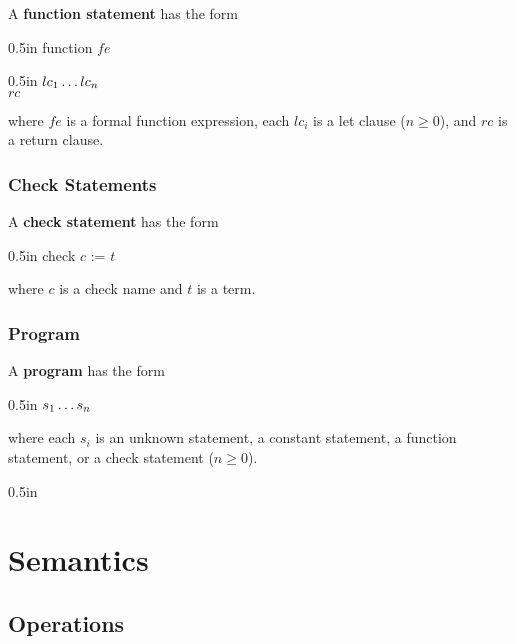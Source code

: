 \documentclass[letterpaper, 12pt]{extarticle}
\theoremstyle{definition} %
\newcommand{\textdef}[1]{\textbf{#1}}
\newenvironment{codeblock}
    {\begin{addmargin}{0.5in} \ttfamily}
    {\end{addmargin}}
\begin{document}
A \textdef{function statement} has the form
\begin{codeblock}
function $fe$
    \begin{codeblock}
    $lc_1 \\
    \ldots \\
    lc_n$ \\
    $rc$
    \end{codeblock}
\end{codeblock}
where $fe$ is a formal function expression,
each $lc_i$ is a let clause ($n \ge 0$), and
$rc$ is a return clause.

\subsubsection{Check Statements}

A \textdef{check statement} has the form
\begin{codeblock}
check $c$ := $t$
\end{codeblock}
where $c$ is a check name and $t$ is a term.

\subsubsection{Program}

A \textdef{program} has the form
\begin{codeblock}
$s_1 \\
\ldots \\
s_n$
\end{codeblock}
where each $s_i$ is an unknown statement,
a constant statement, a function statement, or
a check statement ($n \ge 0$).


\begin{codeblock}

\end{codeblock}

\section{Semantics}

\subsection{Operations}
\end{document}
